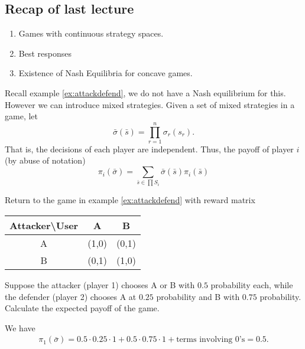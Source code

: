 \newsection
\subsection*{Recap of last lecture}
\begin{enumerate}
    \item Games with continuous strategy spaces.
    \item Best responses
    \item Existence of Nash Equilibria for concave games.
\end{enumerate}

Recall example \ref{ex:attackdefend}, we do not have a Nash equilibrium for this. However we can introduce mixed strategies.
Given a set of mixed strategies in a game, let \[
    \bar{\sigma}(\bar{s}) = \prod_{r=1}^{n}\sigma_r(s_r).\]
That is, the decisions of each player are independent.
Thus, the payoff of player $i$ (by abuse of notation)\[
\pi_i(\bar{\sigma})=\sum_{\bar{s}\in \prod S_i} \bar{\sigma}(\bar{s})\pi_i(\bar{s})
\]
\begin{aexample}{}{}%
    Return to the game in example \ref{ex:attackdefend} with reward matrix
    \begin{center}
        \begin{tabular}{|c|c |c|} 
            \hline
            Attacker\textbackslash User & A&B \\ 
            \hline
            A & (1,0) & (0,1)\\ 
            \hline
            B & (0,1)&(1,0)\\
            \hline
        \end{tabular}
    \end{center}
    Suppose the attacker (player 1) chooses A or B with $0.5$ probability each, while the defender (player 2) chooses A at $0.25$ probability and B with $0.75$ probability.
    Calculate the expected payoff of the game.
\end{aexample}
We have\begin{align*}
    \pi_1(\bar{\sigma}) = 0.5\cdot 0.25 \cdot 1 + 0.5\cdot 0.75\cdot 1 + \textrm{terms involving $0$'s} = 0.5.
\end{align*}

